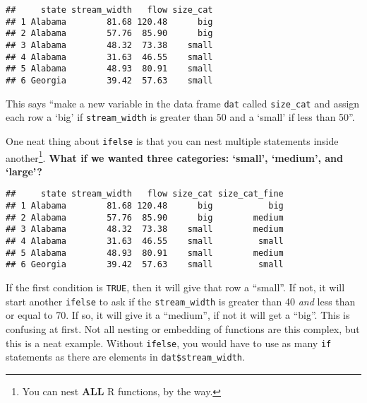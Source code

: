 \documentclass[]{book}
\newenvironment{Shaded}{\begin{snugshade}}{\end{snugshade}}
\newcommand{\KeywordTok}[1]{\textcolor[rgb]{0.13,0.29,0.53}{\textbf{#1}}}
\newcommand{\DecValTok}[1]{\textcolor[rgb]{0.00,0.00,0.81}{#1}}
\newcommand{\StringTok}[1]{\textcolor[rgb]{0.31,0.60,0.02}{#1}}
\newcommand{\OperatorTok}[1]{\textcolor[rgb]{0.81,0.36,0.00}{\textbf{#1}}}
\newcommand{\NormalTok}[1]{#1}
\let\rmarkdownfootnote\footnote%
\def\footnote{\protect\rmarkdownfootnote}
\theoremstyle{definition}
\theoremstyle{definition}
\theoremstyle{definition}
\theoremstyle{remark}
\begin{document}
\begin{verbatim}
##     state stream_width   flow size_cat
## 1 Alabama        81.68 120.48      big
## 2 Alabama        57.76  85.90      big
## 3 Alabama        48.32  73.38    small
## 4 Alabama        31.63  46.55    small
## 5 Alabama        48.93  80.91    small
## 6 Georgia        39.42  57.63    small
\end{verbatim}

This says ``make a new variable in the data frame \texttt{dat} called
\texttt{size\_cat} and assign each row a `big' if \texttt{stream\_width}
is greater than 50 and a `small' if less than 50''.

One neat thing about \texttt{ifelse} is that you can nest multiple
statements inside another\footnote{You can nest \textbf{ALL} R
  functions, by the way.}. \textbf{What if we wanted three categories:
`small', `medium', and `large'?}

\begin{Shaded}
\end{Shaded}

\begin{verbatim}
##     state stream_width   flow size_cat size_cat_fine
## 1 Alabama        81.68 120.48      big           big
## 2 Alabama        57.76  85.90      big        medium
## 3 Alabama        48.32  73.38    small        medium
## 4 Alabama        31.63  46.55    small         small
## 5 Alabama        48.93  80.91    small        medium
## 6 Georgia        39.42  57.63    small         small
\end{verbatim}

If the first condition is \texttt{TRUE}, then it will give that row a
``small''. If not, it will start another \texttt{ifelse} to ask if the
\texttt{stream\_width} is greater than 40 \emph{and} less than or equal
to 70. If so, it will give it a ``medium'', if not it will get a
``big''. This is confusing at first. Not all nesting or embedding of
functions are this complex, but this is a neat example. Without
\texttt{ifelse}, you would have to use as many \texttt{if} statements as
there are elements in \texttt{dat\$stream\_width}.
\end{document}
